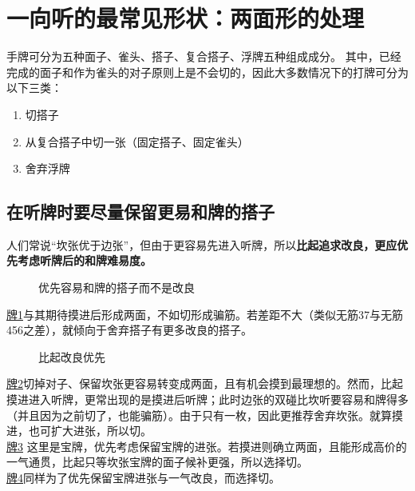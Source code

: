 \chapter[【一向听的技术】两面形的选择 其一]{一向听的最常见形状：两面形的处理}

手牌可分为五种面子、雀头、搭子、复合搭子、浮牌五种组成成分。
其中，已经完成的面子和作为雀头的对子原则上是不会切的，因此大多数情况下的打牌可分为以下三类：\begin{enumerate}
    \item 切搭子
    \item 从复合搭子中切一张（固定搭子、固定雀头）
    \item 舍弃浮牌
\end{enumerate}

\section{在听牌时要尽量保留更易和牌的搭子}
人们常说“坎张优于边张”，但由于更容易先进入听牌，所以\textbf{比起追求改良，更应优先考虑听牌后的和牌难易度。}

\begin{figure}[h]
    \caption{优先容易和牌的搭子而不是改良}
    \label{lec6:pai1}
\end{figure}

\hyperref[lec6:pai1]{牌1}与其期待摸进后形成两面，不如切形成骗筋。若差距不大（类似无筋37与无筋456之差），就倾向于舍弃搭子有更多改良的搭子。

\begin{figure}[h]
    \caption{比起改良优先}
    \label{lec6:pai2-4}
    \par\bigskip
    \par\bigskip
\end{figure}
\hyperref[lec6:pai2-4]{牌2}切掉对子、保留坎张更容易转变成两面，且有机会摸到最理想的。然而，比起摸进进入听牌，更常出现的是摸进后听牌；此时边张的双碰比坎听要容易和牌得多（并且因为之前切了，也能骗筋）。由于只有一枚，因此更推荐舍弃坎张。就算摸进，也可扩大进张，所以切。\\
\hyperref[lec6:pai2-4]{牌3}
这里是宝牌，优先考虑保留宝牌的进张。若摸进则确立两面，且能形成高价的一气通贯，比起只等坎张宝牌的面子候补更强，所以选择切。\\
\hyperlink{lec6:pai2-4}{牌4}同样为了优先保留宝牌进张与一气改良，而选择切。

